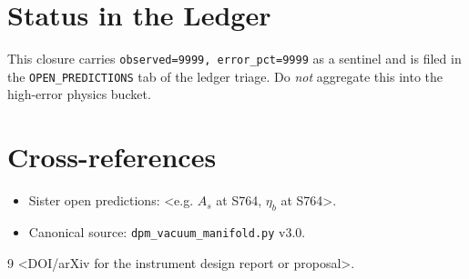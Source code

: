 \documentclass[11pt]{article}
\begin{document}
\section{Status in the Ledger}
This closure carries \texttt{observed=9999, error\_pct=9999} as a sentinel
and is filed in the \texttt{OPEN\_PREDICTIONS} tab of the ledger triage.
Do \emph{not} aggregate this into the high-error physics bucket.

\section{Cross-references}
\begin{itemize}
  \item Sister open predictions: <e.g. $A_s$ at S764, $\eta_b$ at S764>.
  \item Canonical source: \texttt{dpm\_vacuum\_manifold.py} v3.0.
\end{itemize}


\begin{thebibliography}{9}
 <DOI/arXiv for the instrument design report or proposal>.
\end{thebibliography}
\end{document}
